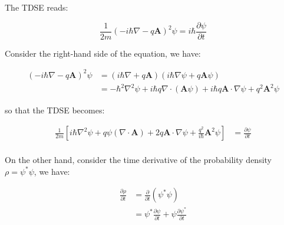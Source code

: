 \documentclass[12pt]{article}
\begin{document}



\pagebreak
\section*{}


The TDSE reads:

\begin{equation}
    \frac{1}{2m} \left( -i\hbar \nabla - q\mathbf{A} \right)^{2} \psi = i\hbar \frac{\partial \psi}{\partial t}
\end{equation}

Consider the right-hand side of the equation, we have:

\begin{equation}
    \begin{split}
        \left( -i\hbar \nabla - q\mathbf{A} \right)^{2} \psi &=
        \left( i\hbar \nabla + q\mathbf{A} \right) \left( i\hbar \nabla \psi + q\mathbf{A}\psi \right) \\
        &= -\hbar^{2} \nabla^{2} \psi + i\hbar q \nabla \cdot \left( \mathbf{A}\psi \right) + i\hbar q \mathbf{A} \cdot \nabla \psi + q^{2} \mathbf{A}^{2} \psi
    \end{split}
\end{equation}

so that the TDSE becomes:

\begin{equation}
    \begin{split}
        \frac{1}{2m} \left[ i\hbar \nabla^{2} \psi + q \psi (\nabla \cdot \mathbf{A}) + 2q \mathbf{A} \cdot \nabla \psi + \frac{q^{2}}{i\hbar} \mathbf{A}^{2} \psi \right] &= \frac{\partial \psi}{\partial t} \\
    \end{split}
\end{equation}

On the other hand, consider the time derivative of the probability density $\rho = \psi^{*}\psi$, we have:

\begin{equation}
    \begin{split}
        \frac{\partial \rho}{\partial t} &= \frac{\partial}{\partial t} \left( \psi^{*}\psi \right) \\
        &= \psi^{*} \frac{\partial \psi}{\partial t} + \psi \frac{\partial \psi^{*}}{\partial t}
    \end{split}
\end{equation}
\end{document}
